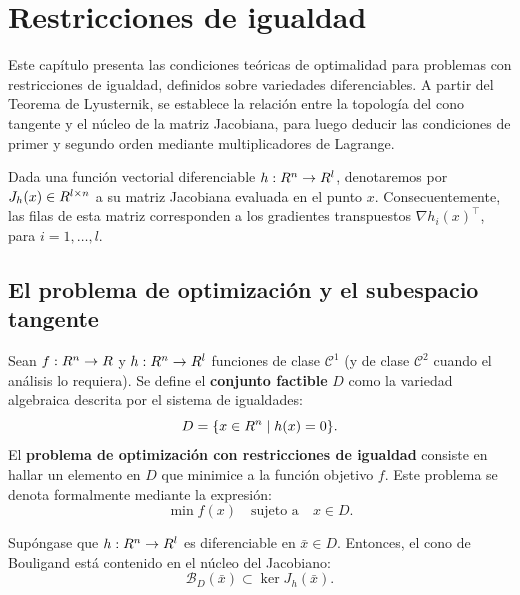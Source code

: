
\chapter{Restricciones de igualdad}
\label{v1:chap:2}

Este capítulo presenta las condiciones teóricas de optimalidad para problemas con restricciones de igualdad, definidos sobre variedades diferenciables. A partir del Teorema de Lyusternik, se establece la relación entre la topología del cono tangente y el núcleo de la matriz Jacobiana, para luego deducir las condiciones de primer y segundo orden mediante multiplicadores de Lagrange.

\begin{notation}
 Dada una función vectorial diferenciable $h : R^n \to R^l$, denotaremos por $J_h(x) \in R^{l \times n}$ a su matriz Jacobiana evaluada en el punto $x$. Consecuentemente, las filas de esta matriz corresponden a los gradientes transpuestos $\nabla h_i(x)^\top$, para $i = 1, \dots, l$.
\end{notation}

\section{El problema de optimización y el subespacio tangente}
\label{v1:sec:2.1}

\begin{definition}\label{v1:def:2.1.1}
 Sean $f : R^n \to R$ y $h : R^n \to R^l$ funciones de clase $\mathcal{C}^1$ (y de clase $\mathcal{C}^2$ cuando el análisis lo requiera). Se define el \textbf{conjunto factible} $D$ como la variedad algebraica descrita por el sistema de igualdades:
 \[
 D = \{ x \in R^n \mid h(x) = 0 \}.
 \]
 El \textbf{problema de optimización con restricciones de igualdad} consiste en hallar un elemento en $D$ que minimice a la función objetivo $f$. Este problema se denota formalmente mediante la expresión:
 \begin{equation}
 \min f(x) \quad \text{sujeto a} \quad x \in D.
 \label{v1:eq:2.1}
 \end{equation}
\end{definition}

\begin{proposition}\label{v1:prop:2.1.1}
	Supóngase que $h : R^n \to R^l$ es diferenciable en $\bar{x} \in D$. Entonces, el cono de Bouligand está contenido en el núcleo del Jacobiano:
	\[
		\mathcal{B}_D(\bar{x}) \subset \ker J_h(\bar{x}).
	\]
\end{proposition}

